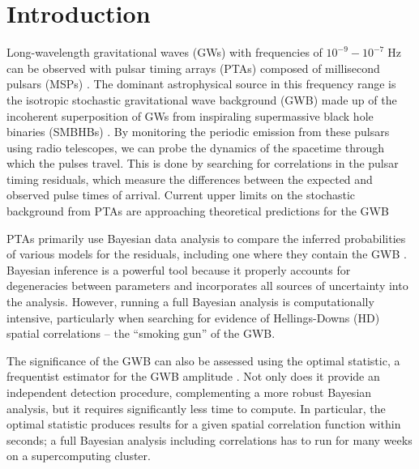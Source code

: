 \documentclass[twocolumn,aps,prd,superscriptaddress]{revtex4-1}
\begin{document}
\maketitle


\section{Introduction}

Long-wavelength gravitational waves (GWs) with frequencies of 
$10^{-9} - 10^{-7} \; \mathrm{Hz}$ can be observed with pulsar timing arrays (PTAs) 
composed of millisecond pulsars (MSPs) \cite{hd1983,fb1990}. 
The dominant astrophysical source in this frequency range is the isotropic stochastic 
gravitational wave background (GWB) 
made up of the incoherent superposition of GWs from inspiraling 
supermassive black hole binaries (SMBHBs) 
\citep{1995ApJ...446..543R, 2003ApJ...583..616J, 2003ApJ...590..691W}. 
By monitoring the periodic emission from these pulsars using radio telescopes, 
we can probe the dynamics of the spacetime through which the pulses travel. 
This is done by searching for correlations in the pulsar timing residuals, 
which measure the differences between the expected and observed pulse times of arrival. 
Current upper limits on the stochastic background from PTAs are approaching 
theoretical predictions for the GWB \citep{PPTA2013,EPTA2015,abb+17b}

PTAs primarily use Bayesian data analysis to compare the inferred probabilities 
of various models for the residuals, 
including one where they contain the GWB 
\citep{vlm+2009,lah+2013}. 
Bayesian inference is a powerful tool because 
it properly accounts for degeneracies between parameters 
and incorporates all sources of uncertainty into the analysis. 
However, running a full Bayesian analysis is computationally intensive, 
particularly when searching for evidence of Hellings-Downs (HD) spatial correlations --
the ``smoking gun'' of the GWB.

The significance of the GWB can also be assessed using the 
optimal statistic, a frequentist estimator for the GWB amplitude \citep{abc+2009,demorest+2013,ccs+2015}. 
Not only does it provide an independent detection procedure, complementing a more robust Bayesian analysis, but it requires significantly less time to compute. In particular, the optimal statistic produces results for a given spatial correlation function within seconds; a full Bayesian analysis including correlations has to run for many weeks on a supercomputing cluster. 
\end{document}
